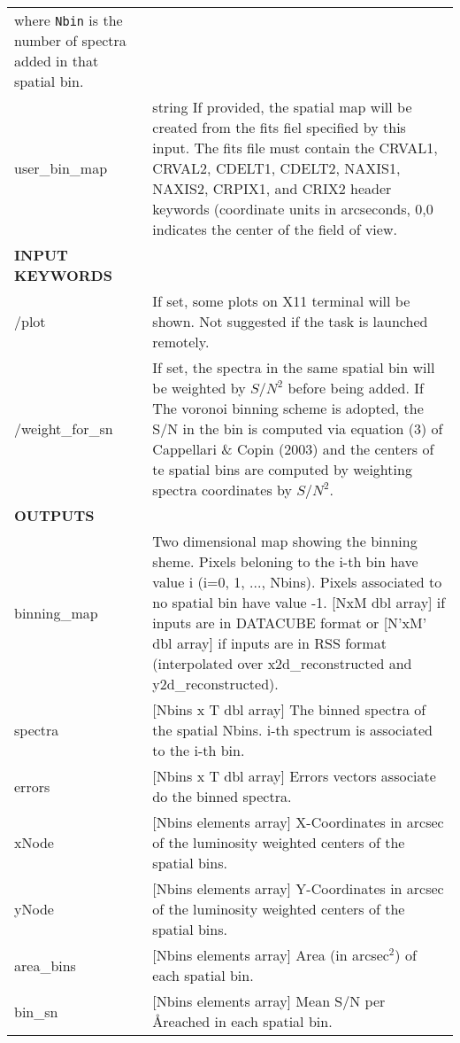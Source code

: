 \begin{center}
\begin{longtable}{p{2.7cm}| p{11.1cm} }
                    where {\tt Nbin} is the number of spectra added in that spatial bin.\\
%
user\_bin\_map   &  string  If provided, the spatial map will be created
                      from the fits fiel specified by this input. The
                      fits file must contain the CRVAL1, CRVAL2,
                      CDELT1, CDELT2, NAXIS1, NAXIS2, CRPIX1, and
                      CRIX2 header keywords (coordinate units in
                      arcseconds, 0,0 indicates the center of the
                      field of view. \\

\hline
{\bf INPUT KEYWORDS} & \\
\hline
%
/plot        &       If set, some plots on X11 terminal will be shown. Not suggested if the task is launched remotely. \\
% 
/weight\_for\_sn & If set, the spectra in the same spatial bin will be
                 weighted by $S/N^2$ before being added. If The voronoi binning scheme
                 is adopted, the S/N in the bin is computed via equation (3) of
                 Cappellari \& Copin (2003) and the centers of te spatial bins are computed by
                 weighting spectra coordinates by $S/N^2$.\\ 
%
\hline
{\bf OUTPUTS} & \\
\hline
%
binning\_map & Two dimensional map showing the binning sheme. Pixels beloning to the i-th bin have value i (i=0, 1, ..., Nbins). 
             Pixels associated to no spatial bin have value -1.  
             [NxM dbl array] if inputs are in DATACUBE format or [N'xM' dbl array] if inputs are in RSS format (interpolated 
             over x2d\_reconstructed and y2d\_reconstructed).\\
%
spectra   &  [Nbins x T dbl array]    The binned spectra of the spatial Nbins. i-th spectrum is associated to the i-th bin. \\
%
errors    &  [Nbins x T dbl array]    Errors vectors associate do the binned spectra. \\
%
xNode     &  [Nbins elements array]   X-Coordinates in arcsec of the luminosity weighted centers of the spatial bins. \\
%
yNode     &  [Nbins elements array]   Y-Coordinates in arcsec of the luminosity weighted centers of the spatial bins. \\
%
area\_bins &  [Nbins elements array]   Area (in arcsec$^2$) of each spatial bin.  \\
%
bin\_sn   &  [Nbins elements array]   Mean S/N per \AA reached in each spatial bin. \\

\end{longtable}
\end{center}
